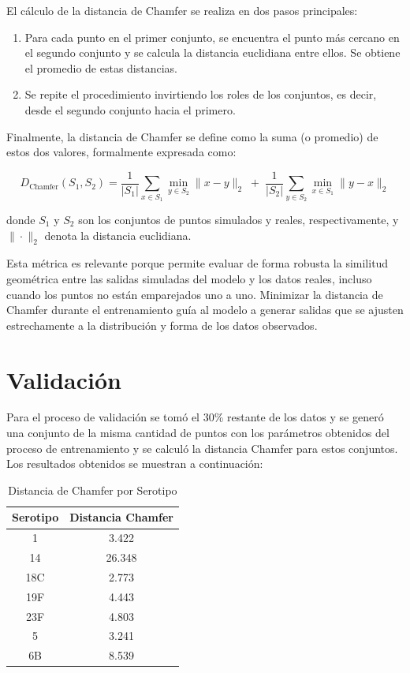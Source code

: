 El cálculo de la distancia de Chamfer se realiza en dos pasos principales:

\begin{enumerate}
    \item Para cada punto en el primer conjunto, se encuentra el punto más cercano en el segundo conjunto y se calcula la distancia euclidiana entre ellos. Se obtiene el promedio de estas distancias.
    \item Se repite el procedimiento invirtiendo los roles de los conjuntos, es decir, desde el segundo conjunto hacia el primero.
\end{enumerate}

Finalmente, la distancia de Chamfer se define como la suma (o promedio) de estos dos valores, formalmente expresada como:

\[
D_{\mathrm{Chamfer}}(S_1, S_2) = \frac{1}{|S_1|} \sum_{x \in S_1} \min_{y \in S_2} \|x - y\|_2 \;+\; \frac{1}{|S_2|} \sum_{y \in S_2} \min_{x \in S_1} \|y - x\|_2
\]

donde \( S_1 \) y \( S_2 \) son los conjuntos de puntos simulados y reales, respectivamente, y \(\|\cdot\|_2\) denota la distancia euclidiana.

Esta métrica es relevante porque permite evaluar de forma robusta la similitud geométrica entre las salidas simuladas del modelo y los datos reales, incluso cuando los puntos no están emparejados uno a uno. Minimizar la distancia de Chamfer durante el entrenamiento guía al modelo a generar salidas que se ajusten estrechamente a la distribución y forma de los datos observados.


\section{Validación}
Para el proceso de validación se tomó el 30\% restante de los datos y se generó una conjunto de la misma cantidad de puntos con los parámetros obtenidos del proceso de entrenamiento y se calculó la distancia Chamfer para estos conjuntos. Los resultados obtenidos se muestran a continuación:

\begin{table}[h]
\centering
\caption{Distancia de Chamfer por Serotipo}
\begin{tabular}{|c|c|}
\hline
\textbf{Serotipo} & \textbf{Distancia Chamfer} \\
\hline
1   & 3.422  \\
14  & 26.348 \\
18C & 2.773  \\
19F & 4.443  \\
23F & 4.803  \\
5   & 3.241  \\
6B  & 8.539  \\
\hline
\end{tabular}
\label{tab:chamfer_serotipos}
\end{table}

